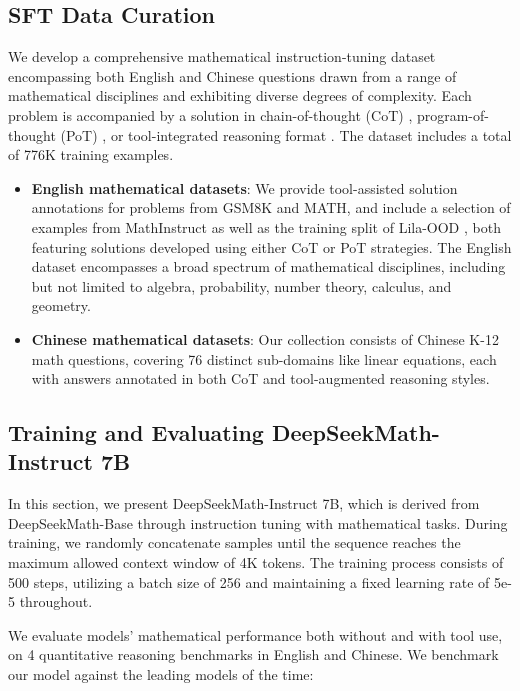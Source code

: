 \begin{itemize}[topsep=0pt]
\subsection{SFT Data Curation}

We develop a comprehensive mathematical instruction-tuning dataset encompassing both English and Chinese questions drawn from a range of mathematical disciplines and exhibiting diverse degrees of complexity. Each problem is accompanied by a solution in chain-of-thought (CoT) \citep{cot}, program-of-thought (PoT) \citep{pot,pal}, or tool-integrated reasoning format \citep{tora}. The dataset includes a total of 776K training examples.

\begin{itemize}[topsep=0pt]
    \item \textbf{English mathematical datasets}: We provide tool-assisted solution annotations for problems from GSM8K and MATH, and include a selection of examples from MathInstruct \citep{MathInstruct} as well as the training split of Lila-OOD \citep{lila}, both featuring solutions developed using either CoT or PoT strategies. The English dataset encompasses a broad spectrum of mathematical disciplines, including but not limited to algebra, probability, number theory, calculus, and geometry.
    \item \textbf{Chinese mathematical datasets}: Our collection consists of Chinese K-12 math questions, covering 76 distinct sub-domains like linear equations, each with answers annotated in both CoT and tool-augmented reasoning styles.
\end{itemize}

\subsection{Training and Evaluating DeepSeekMath-Instruct 7B}

In this section, we present DeepSeekMath-Instruct 7B, which is derived from DeepSeekMath-Base through instruction tuning with mathematical tasks. During training, we randomly concatenate samples until the sequence reaches the maximum allowed context window of 4K tokens. The training process consists of 500 steps, utilizing a batch size of 256 and maintaining a fixed learning rate of 5e-5 throughout.

We evaluate models' mathematical performance both without and with tool use, on 4 quantitative reasoning benchmarks in English and Chinese. We benchmark our model against the leading models of the time:


\end{itemize}
